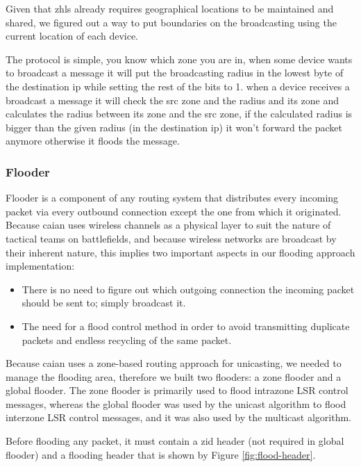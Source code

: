 Given that \acrshort{zhls} already requires geographical locations to be maintained and shared, we figured out a way to put boundaries on the broadcasting using the current location of each device.

The protocol is simple, you know which zone you are in, when some device wants to broadcast a message it will put the broadcasting radius in the lowest byte of the destination \acrshort{ip} while setting the rest of the bits to 1.
when a device receives a broadcast a message it will check the src zone and the radius and its zone and calculates the radius between its zone and the src zone, if the calculated radius is bigger than the given radius (in the destination \acrshort{ip}) it won't forward the packet anymore otherwise it floods the message.

\subsubsection{Flooder}
Flooder is a component of any routing system that distributes every incoming packet via every outbound connection except the one from which it originated. Because \acrshort{caian} uses wireless channels as a physical layer to suit the nature of tactical teams on battlefields, and because wireless networks are broadcast by their inherent nature, this implies two important aspects in our flooding approach implementation:

\begin{itemize}[itemsep=1pt, topsep=5pt]
    \item There is no need to figure out which outgoing connection the incoming packet should be sent to; simply broadcast it.
    \item The need for a flood control method in order to avoid transmitting duplicate packets and endless recycling of the same packet.
\end{itemize}

Because \acrshort{caian} uses a zone-based routing approach for unicasting, we needed to manage the flooding area, therefore we built two flooders: a zone flooder and a global flooder. The zone flooder is primarily used to flood intrazone LSR control messages, whereas the global flooder was used by the unicast algorithm to flood interzone LSR control messages, and it was also used by the multicast algorithm.

Before flooding any packet, it must contain a \acrshort{zid} header (not required in global flooder) and a flooding header that is shown by Figure  \ref{fig:flood-header}. 

